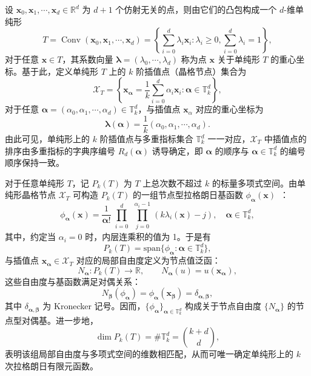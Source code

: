 设 $\boldsymbol{x}_0,\boldsymbol{x}_1,\cdots,\boldsymbol{x}_d\in\mathbb{R}^d$ 为 $d+1$ 个仿射无关的点，则由它们的凸包构成一个 $d$-维单纯形
\[
T = \operatorname{Conv}(\boldsymbol{x}_0,\boldsymbol{x}_1,\cdots,\boldsymbol{x}_d) = \left\{\sum_{i=0}^d\lambda_i\boldsymbol{x}_i:\lambda_i\geq0,\sum_{i=0}^d\lambda_i=1\right\},
\]
对于任意 $\boldsymbol{x}\in{T}$，其系数向量 $\boldsymbol{\lambda} = (\lambda_0,\cdots,\lambda_d)$ 称为点 $\boldsymbol{x}$ 关于单纯形 $T$ 的重心坐标。基于此，定义单纯形 $T$ 上的 $k$ 阶插值点（晶格节点）集合为
\[
\mathcal{X}_T = \left\{\boldsymbol{x}_{\boldsymbol{\alpha}} = \frac{1}{k}\sum_{i=0}^{d}\alpha_i\boldsymbol{x}_i:\boldsymbol{\alpha}\in\mathbb{T}_k^d\right\},
\]
对于任意 $\boldsymbol{\alpha} = (\alpha_0,\alpha_1,\cdots,\alpha_d)\in\mathbb{T}_k^d$，与插值点 $\boldsymbol{x}_{\alpha}$ 对应的重心坐标为
\[
\boldsymbol{\lambda}(\boldsymbol{\alpha}) = \frac{1}{k}(\alpha_0,\alpha_1,\cdots,\alpha_d).
\]
由此可见，单纯形上的 $k$ 阶插值点与多重指标集合 $\mathbb{T}_k^d$ 一一对应，$\mathcal{X}_T$ 中插值点的排序由多重指标的字典序编号 $R_d(\boldsymbol{\alpha})$ 诱导确定，即 $\boldsymbol{\alpha}$ 的顺序与 $\boldsymbol{\alpha}\in\mathbb{T}_k^d$ 的编号顺序保持一致。

对于任意单纯形 $T$，记 $P_k(T)$ 为 $T$ 上总次数不超过 $k$ 的标量多项式空间。由单纯形晶格节点 $\mathcal{X}_T$ 可构造 $P_k(T)$ 的一组节点型拉格朗日基函数 $\phi_{\boldsymbol\alpha}(\boldsymbol{x})$~\cite{nicolaidesClassFiniteElements1972, chenGeometricDecompositionEfficient2024b}：
\[
\phi_{\boldsymbol{\alpha}}(\boldsymbol{x}) = \frac{1}{\boldsymbol{\alpha}!}\prod_{\substack{i=0}}^d\prod_{\substack{j=0}}^{\alpha_i-1}(k\lambda_i(\boldsymbol{x}) - j),\quad\boldsymbol{\alpha}\in\mathbb{T}_k^d,
\]
其中，约定当 $\alpha_i=0$ 时，内层连乘积的值为 1。于是有
\[
P_k(T) = \text{span}\{\phi_{\boldsymbol{\alpha}}:\boldsymbol{\alpha}\in\mathbb{T}_k^d\},
\]
与插值点 $\boldsymbol{x}_{\boldsymbol{\alpha}}\in\mathcal{X}_T$ 对应的局部自由度定义为节点值泛函：
\[
N_{\boldsymbol{\alpha}} : P_k(T) \to \mathbb{R},\qquad N_{\boldsymbol{\alpha}}(u) = u(\boldsymbol{x}_{\boldsymbol{\alpha}}),
\]
这些自由度与基函数满足对偶关系：
\[
N_{\boldsymbol{\beta}}(\phi_{\boldsymbol{\alpha}}) = \phi_{\boldsymbol{\alpha}}(\boldsymbol{x}_{\boldsymbol{\beta}}) = \delta_{\boldsymbol{\alpha},\boldsymbol{\beta}},
\]
其中 $\delta_{\boldsymbol{\alpha},\boldsymbol{\beta}}$ 为 Kronecker 记号。因而，$\{\phi_{\boldsymbol{\alpha}}\}_{\boldsymbol{\alpha}\in\mathbb{T}_k^d}$ 构成关于节点自由度 $\{N_{\boldsymbol{\alpha}}\}$ 的节点型对偶基。进一步地，
\[
\dim P_k(T)=\#\mathbb{T}_k^d=\binom{k+d}{d},
\]
表明该组局部自由度与多项式空间的维数相匹配，从而可唯一确定单纯形上的 $k$ 次拉格朗日有限元函数。

